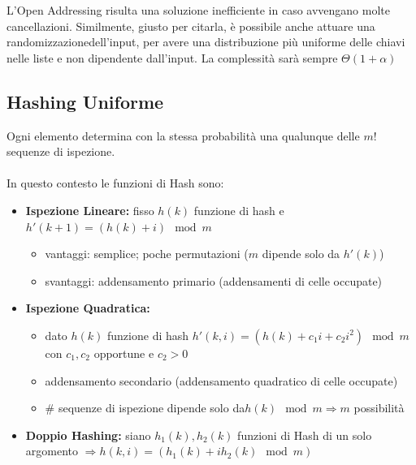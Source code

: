 L'Open Addressing risulta una soluzione inefficiente in caso avvengano molte cancellazioni. Similmente, giusto per citarla, è possibile anche attuare una randomizzazionedell'input, per avere una distribuzione più uniforme delle chiavi nelle liste e non dipendente dall'input. La complessità sarà sempre $\Theta(1+\alpha)$

\subsection{Hashing Uniforme}
Ogni elemento determina con la stessa probabilità una qualunque delle $m!$ sequenze di ispezione. \\~\\
In questo contesto le funzioni di Hash sono:
\begin{itemize}
    \item \textbf{Ispezione Lineare:} fisso $h(k)$ funzione di hash e $h'(k+1) = (h(k) + i) \mod m$
    \begin{itemize}
        \item vantaggi: semplice; poche permutazioni  ($m$ dipende solo da $h'(k)$)
        \item svantaggi: addensamento primario (addensamenti di celle occupate)
    \end{itemize}
    \item \textbf{Ispezione Quadratica:}
    \begin{itemize}
        \item dato $h(k)$ funzione di hash $h'(k,i) = (h(k) + c_1i + c_2i^2) \mod m$ con $c_1, c_2$ opportune e $c_2 > 0$
        \item addensamento secondario (addensamento quadratico di celle occupate)
        \item \# sequenze di ispezione dipende solo da$h(k) \mod m \Rightarrow m$ possibilità
    \end{itemize}
    \item \textbf{Doppio Hashing:} siano $h_1(k), h_2(k)$ funzioni di Hash di un solo argomento $\Rightarrow h(k,i) = (h_1(k) + ih_2(k) \mod m)$
\end{itemize}

